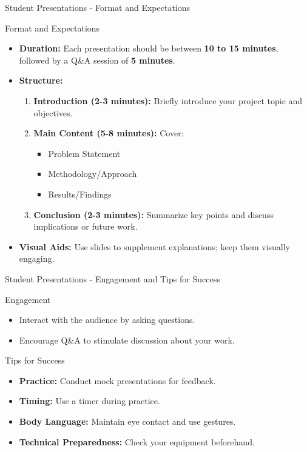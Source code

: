\documentclass[aspectratio=169]{beamer}
\begin{document}
\begin{frame}[fragile]{Student Presentations - Format and Expectations}
    \begin{block}{Format and Expectations}
        \begin{itemize}
            \item \textbf{Duration:} Each presentation should be between \textbf{10 to 15 minutes}, followed by a Q\&A session of \textbf{5 minutes}.
            \item \textbf{Structure:}
            \begin{enumerate}
                \item \textbf{Introduction (2-3 minutes):} Briefly introduce your project topic and objectives.
                \item \textbf{Main Content (5-8 minutes):} Cover:
                \begin{itemize}
                    \item Problem Statement
                    \item Methodology/Approach
                    \item Results/Findings
                \end{itemize}
                \item \textbf{Conclusion (2-3 minutes):} Summarize key points and discuss implications or future work.
            \end{enumerate}
            \item \textbf{Visual Aids:} Use slides to supplement explanations; keep them visually engaging.
        \end{itemize}
    \end{block}
\end{frame}

\begin{frame}[fragile]{Student Presentations - Engagement and Tips for Success}
    \begin{block}{Engagement}
        \begin{itemize}
            \item Interact with the audience by asking questions.
            \item Encourage Q\&A to stimulate discussion about your work.
        \end{itemize}
    \end{block}

    \begin{block}{Tips for Success}
        \begin{itemize}
            \item \textbf{Practice:} Conduct mock presentations for feedback.
            \item \textbf{Timing:} Use a timer during practice.
            \item \textbf{Body Language:} Maintain eye contact and use gestures.
            \item \textbf{Technical Preparedness:} Check your equipment beforehand.
        \end{itemize}
    \end{block}
\end{frame}
\end{document}
